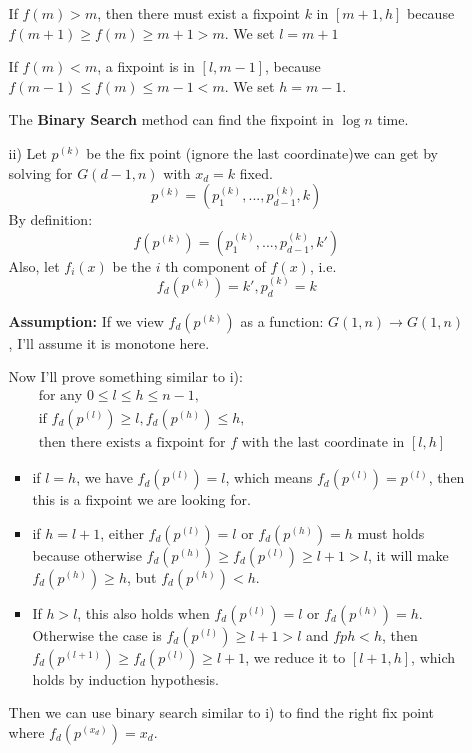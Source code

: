 \documentclass[twoside]{homework}
\begin{document}
\begin{enumerate}
\begin{enumerate}
			If $f(m) > m$, then there must exist a fixpoint $k$ in $[m+1, h]$ because $f(m + 1) \geq f(m) \geq m + 1 > m$. We set $l = m + 1$

			If $f(m) < m$, a fixpoint is in $[l, m-1]$, because $f(m-1) \leq f(m) \leq m-1 < m$. We set $h = m-1$.


			The \textbf{Binary Search} method can find the fixpoint in $\log n$ time.

			\item [ii)] Let $p^{(k)}$ be the fix point (ignore the last coordinate)we can get by solving for $G(d-1, n)$ with $x_d = k$ fixed.
			\[ p^{(k)} = (p^{(k)}_1, ..., p^{(k)}_{d-1}, k)\]
			By definition:
			\[f(p^{(k)}) = (p^{(k)}_1, ..., p^{(k)}_{d-1}, k')\]
			Also, let $f_i(x)$ be the $i$ th component of $f(x)$, i.e.
			\[ f_d(p^{(k)}) = k', p_d^{(k)} = k\]

			\textbf{Assumption:} If we view $f_d(p^{(k)})$ as a function: $G(1, n) \rightarrow G(1, n)$, I'll assume it is monotone here.


		\newcommand{\pl}{\ensuremath{p^{(l)}}}
		\newcommand{\ph}{\ensuremath{p^{(h)}}}
		\newcommand{\fpl}{\ensuremath{f_d(p^{(l)})}}
		\newcommand{\fph}{\ensuremath{f_d(p^{(h)})}}
		\newcommand{\fpm}{\ensuremath{f_d(p^{(m)})}}
			Now I'll prove something similar to i):
			\begin{align*}
			&\text{for any } 0 \leq l \leq h \leq n-1, \\
			&\text{if } \fpl \geq l, \fph \leq h, \\
			&\text{then there exists a fixpoint for } f \text{ with the last coordinate in } [l, h]
		\end{align*}
		\begin{itemize}
			\item if $l = h$, we have $\fpl = l$, which means $\fpl = \pl$, then this is a fixpoint we are looking for.
			\item if $h = l + 1$, either $\fpl = l$ or $\fph = h$ must holds because otherwise $\fph \geq\fpl \geq l+1 > l$, it will make $\fph \geq h$, but $\fph < h$.
			\item If $h > l$, this also holds when $\fpl = l$ or $\fph = h$. Otherwise the case is $\fpl \geq l+1 > l$ and $fph < h$, then $f_d(p^{(l+1)}) \geq \fpl \geq l+1$, we reduce it to $[l+1, h]$, which holds by induction hypothesis.
		\end{itemize}

		Then we can use binary search similar to i) to find the right fix point where $f_d(p^{(x_d)}) = x_d$.
		\end{enumerate}
\end{enumerate}



\end{document}
